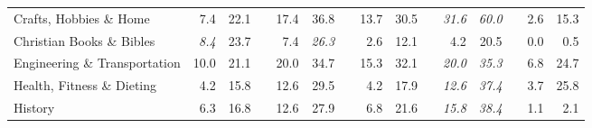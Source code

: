 \documentclass[12pt]{article}
\numberwithin{equation}{section}
\numberwithin{figure}{section}
\begin{document}
\begin{table}[]
{\begin{tabular}{lrrrrrrrrrrrrrr}
	Crafts, Hobbies \& Home        & 7.4                                & 22.1                               &                               & 17.4                               & 36.8                               &                               & 13.7                               & 30.5                               &                               & \textit{31.6}                      & \textit{60.0}                      &                               & 2.6                                & 15.3                               \\
	Christian Books \& Bibles      & \textit{8.4}                       & 23.7                               &                               & 7.4                                & \textit{26.3}                      &                               & 2.6                                & 12.1                               &                               & 4.2                                & 20.5                               &                               & 0.0                                & 0.5                                \\
	Engineering \& Transportation  & 10.0                               & 21.1                               &                               & 20.0                               & 34.7                               &                               & 15.3                               & 32.1                               &                               & \textit{20.0}                      & \textit{35.3}                      &                               & 6.8                                & 24.7                               \\
	Health, Fitness \& Dieting     & 4.2                                & 15.8                               &                               & 12.6                               & 29.5                               &                               & 4.2                                & 17.9                               &                               & \textit{12.6}                      & \textit{37.4}                      &                               & 3.7                                & 25.8                               \\
	History                        & 6.3                                & 16.8                               &                               & 12.6                               & 27.9                               &                               & 6.8                                & 21.6                               &                               & \textit{15.8}                      & \textit{38.4}                      &                               & 1.1                                & 2.1                                \\

\end{tabular}}
\end{table}
\end{document}

